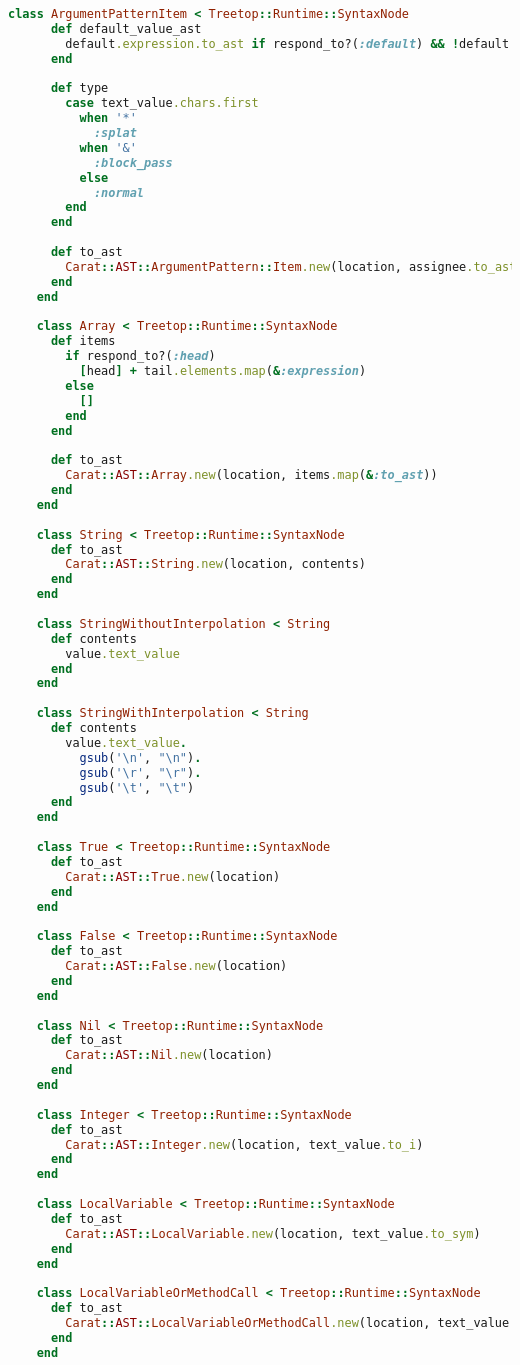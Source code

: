 \begin{lstlisting}[title={\small\ttfamily\bfseries parser/nodes.rb},language=Ruby]
    class ArgumentPatternItem < Treetop::Runtime::SyntaxNode
      def default_value_ast
        default.expression.to_ast if respond_to?(:default) && !default.empty?
      end
      
      def type
        case text_value.chars.first
          when '*'
            :splat
          when '&'
            :block_pass
          else
            :normal
        end
      end
      
      def to_ast
        Carat::AST::ArgumentPattern::Item.new(location, assignee.to_ast, type, default_value_ast)
      end
    end
    
    class Array < Treetop::Runtime::SyntaxNode
      def items
        if respond_to?(:head)
          [head] + tail.elements.map(&:expression)
        else
          []
        end
      end
      
      def to_ast
        Carat::AST::Array.new(location, items.map(&:to_ast))
      end
    end
    
    class String < Treetop::Runtime::SyntaxNode
      def to_ast
        Carat::AST::String.new(location, contents)
      end
    end
    
    class StringWithoutInterpolation < String
      def contents
        value.text_value
      end
    end
    
    class StringWithInterpolation < String
      def contents
        value.text_value.
          gsub('\n', "\n").
          gsub('\r', "\r").
          gsub('\t', "\t")
      end
    end
    
    class True < Treetop::Runtime::SyntaxNode
      def to_ast
        Carat::AST::True.new(location)
      end
    end
    
    class False < Treetop::Runtime::SyntaxNode
      def to_ast
        Carat::AST::False.new(location)
      end
    end
    
    class Nil < Treetop::Runtime::SyntaxNode
      def to_ast
        Carat::AST::Nil.new(location)
      end
    end
    
    class Integer < Treetop::Runtime::SyntaxNode
      def to_ast
        Carat::AST::Integer.new(location, text_value.to_i)
      end
    end
    
    class LocalVariable < Treetop::Runtime::SyntaxNode
      def to_ast
        Carat::AST::LocalVariable.new(location, text_value.to_sym)
      end
    end
    
    class LocalVariableOrMethodCall < Treetop::Runtime::SyntaxNode
      def to_ast
        Carat::AST::LocalVariableOrMethodCall.new(location, text_value.to_sym)
      end
    end
    

\end{lstlisting}
